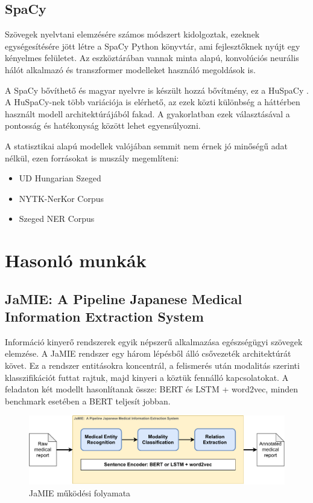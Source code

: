 \subsection{SpaCy}
Szövegek nyelvtani elemzésére számos módszert kidolgoztak, ezeknek egységesítésére jött létre a SpaCy \cite{spacy} Python könyvtár, ami fejlesztőknek nyújt egy kényelmes felületet. Az eszköztárában vannak minta alapú, konvolúciós neurális hálót alkalmazó és transzformer modelleket használó megoldások is.

A SpaCy bővíthető és magyar nyelvre is készült hozzá bővítmény, ez a HuSpaCy \cite{huspacy} . A HuSpaCy-nek több variációja is elérhető, az ezek közti különbség a háttérben használt modell architektúrájából fakad. A gyakorlatban ezek választásával a pontosság és hatékonyság között lehet egyensúlyozni.

A statisztikai alapú modellek valójában semmit nem érnek jó minőségű adat nélkül, ezen forrásokat is muszály megemlíteni:
\begin{itemize}
	\item UD Hungarian Szeged \cite{ud-hungarian-szeged} \cite{vincze-etal-2010-hungarian}
	\item NYTK-NerKor Corpus \cite{nerkor}
	\item Szeged NER Corpus \cite{szarvas-etal-2006-highly}
\end{itemize}

\section{Hasonló munkák}
\subsection{JaMIE: A Pipeline Japanese Medical Information Extraction System \cite{jamie}}

Információ kinyerő rendszerek egyik népszerű alkalmazása egészségügyi szövegek elemzése. A JaMIE rendszer egy három lépésből álló csővezeték architektúrát követ. Ez a rendszer entitásokra koncentrál, a felismerés után modalitás szerinti klasszifikációt futtat rajtuk, majd kinyeri a köztük fennálló kapcsolatokat. A feladaton két modellt hasonlítanak össze: BERT és LSTM + word2vec, minden benchmark esetében a BERT teljesít jobban.

\begin{figure}[H]
	\centering
	\includegraphics[width=1\textwidth]{figures/jamie.pdf}
	\caption{JaMIE működési folyamata \cite{jamie}}
\end{figure}

